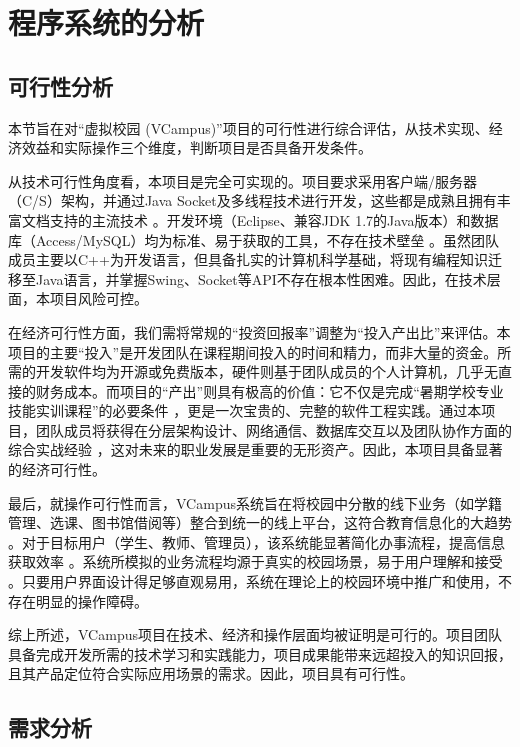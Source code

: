 \ifx\maindoc\undefined
{}
\fi

\section{程序系统的分析}

\subsection{可行性分析}

本节旨在对“虚拟校园 (VCampus)”项目的可行性进行综合评估，从技术实现、经济效益和实际操作三个维度，判断项目是否具备开发条件。

从技术可行性角度看，本项目是完全可实现的。项目要求采用客户端/服务器（C/S）架构，并通过Java Socket及多线程技术进行开发，这些都是成熟且拥有丰富文档支持的主流技术 。开发环境（Eclipse、兼容JDK 1.7的Java版本）和数据库（Access/MySQL）均为标准、易于获取的工具，不存在技术壁垒 。虽然团队成员主要以C++为开发语言，但具备扎实的计算机科学基础，将现有编程知识迁移至Java语言，并掌握Swing、Socket等API不存在根本性困难。因此，在技术层面，本项目风险可控。

在经济可行性方面，我们需将常规的“投资回报率”调整为“投入产出比”来评估。本项目的主要“投入”是开发团队在课程期间投入的时间和精力，而非大量的资金。所需的开发软件均为开源或免费版本，硬件则基于团队成员的个人计算机，几乎无直接的财务成本。而项目的“产出”则具有极高的价值：它不仅是完成“暑期学校专业技能实训课程”的必要条件 ，更是一次宝贵的、完整的软件工程实践。通过本项目，团队成员将获得在分层架构设计、网络通信、数据库交互以及团队协作方面的综合实战经验 ，这对未来的职业发展是重要的无形资产。因此，本项目具备显著的经济可行性。

最后，就操作可行性而言，VCampus系统旨在将校园中分散的线下业务（如学籍管理、选课、图书馆借阅等）整合到统一的线上平台，这符合教育信息化的大趋势 。对于目标用户（学生、教师、管理员），该系统能显著简化办事流程，提高信息获取效率 。系统所模拟的业务流程均源于真实的校园场景，易于用户理解和接受 。只要用户界面设计得足够直观易用，系统在理论上的校园环境中推广和使用，不存在明显的操作障碍。

综上所述，VCampus项目在技术、经济和操作层面均被证明是可行的。项目团队具备完成开发所需的技术学习和实践能力，项目成果能带来远超投入的知识回报，且其产品定位符合实际应用场景的需求。因此，项目具有可行性。

\subsection{需求分析}

